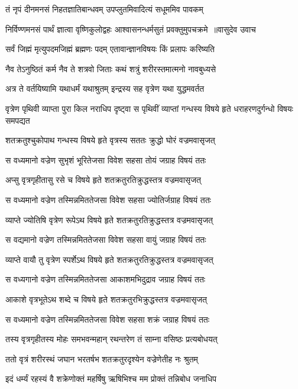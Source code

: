 \twolineshloka
{तं नृपं दीनमनसं निहतज्ञातिबान्धवम्}
{उपप्लुतमिवादित्यं सधूममिव पावकम्}


\threelineshloka
{निर्विण्णमनसं पार्थं ज्ञात्वा वृष्णिकुलोद्वहः}
{आश्वासनन्धर्मसुतं प्रवक्तुमुपचक्रमे ॥वासुदेव उवाच}
{}


\twolineshloka
{सर्वं जिह्मं मृत्युपदमजिह्मं ब्रह्मणः पदम्}
{एतावान्ज्ञानविषयः किं प्रलापः करिष्यति}


\twolineshloka
{नैव तेऽनुष्ठितं कर्म नैव ते शत्रवो जिताः}
{कथं शत्रुं शरीरस्तमात्मनो नावबुध्यसे}


\twolineshloka
{अत्र ते वर्तयिष्यामि यथाधर्मं यथाश्रुतम्}
{इन्द्रस्य सह वृत्रेण यथा युद्धमवर्तत}


\threelineshloka
{वृत्रेण पृथिवी व्याप्ता पुरा किल नराधिप}
{दृष्ट्वा स पृथिवीं व्याप्तां गन्धस्य विषये हृते}
{धराहरणदुर्गन्धो विषयः समपद्यत}


\twolineshloka
{शतक्रतुश्चुकोपाथ गन्धस्य विषये हृते}
{वृत्रस्य सततः क्रुद्धो घोरं वज्रमवासृजत्}


\twolineshloka
{स वध्यमानो वज्रेण सुभृशं भूरितेजसा}
{विवेश सहसा तोयं जग्राह विषयं ततः}


\twolineshloka
{अप्सु वृत्रगृहीतासु रसे च विषये हृते}
{शतक्रतुरतिक्रुद्धस्तत्र वज्रमवासृजत्}


\twolineshloka
{स वध्यमानो वज्रेण तस्मिन्नमिततेजसा}
{विवेश सहसा ज्योतिर्जग्राह विषयं ततः}


\twolineshloka
{व्याप्ते ज्योतिषि वृत्रेण रूपेऽथ विषये हृते}
{शतक्रतुरतिक्रुद्धस्तत्र वज्रमवासृजत्}


\twolineshloka
{स वद्यमानो वज्रेण तस्मिन्नमिततेजसा}
{विवेश सहसा वायुं जग्राह विषयं ततः}


\twolineshloka
{व्याप्ते वायौ तु वृत्रेण स्पर्शेऽथ विषये हृते}
{शतक्रतुरतिक्रुद्धस्तत्र वज्रमवासृजत्}


\twolineshloka
{स वध्यगानो वज्रेण तस्मिन्नमिततेजसा}
{आकाशमभिदुद्राव जग्राह विषयं ततः}


\twolineshloka
{आकाशे वृत्रभूतेऽथ शब्दे च विषये हृते}
{शतक्रतुरभिक्रुद्धस्तत्र वज्रमवासृजत्}


\twolineshloka
{स वध्यमानो वज्रेण तस्मिन्नमिततेजसा}
{विवेश सहसा शक्रं जग्राह विषयं ततः}


\twolineshloka
{तस्य वृत्रगृहीतस्य मोहः समभवन्महान्}
{रथन्तरेण तं साम्ना वसिष्ठः प्रत्यबोधयत्}


\twolineshloka
{ततो वृत्रं शरीरस्थं जघान भरतर्षभ}
{शतक्रतुरदृश्येन वज्रेणेतीह नः श्रुतम्}


\twolineshloka
{इदं धर्म्यं रहस्यं वै शक्रेणोक्तं महर्षिषु}
{ऋषिभिश्च मम प्रोक्तं तन्निबोध जनाधिप}


